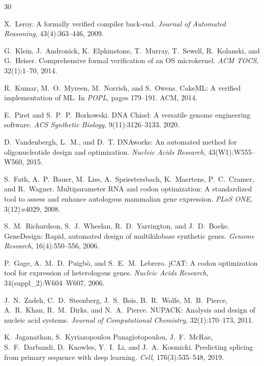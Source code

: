 \documentclass[runningheads]{llncs}
\begin{document}
\begin{thebibliography}{30}

X.~Leroy.
\newblock A formally verified compiler back-end.
\newblock \emph{Journal of Automated Reasoning}, 43(4):363--446, 2009.

G.~Klein, J.~Andronick, K.~Elphinstone, T.~Murray, T.~Sewell, R.~Kolanski,
  and G.~Heiser.
\newblock Comprehensive formal verification of an OS microkernel.
\newblock \emph{ACM TOCS}, 32(1):1--70, 2014.

R.~Kumar, M.~O.~Myreen, M.~Norrish, and S.~Owens.
\newblock CakeML: A verified implementation of ML.
\newblock In \emph{POPL}, pages 179--191. ACM, 2014.

E.~Piret and S.~P.~P.~Borkowski.
\newblock DNA Chisel: A versatile genome engineering software.
\newblock \emph{ACS Synthetic Biology}, 9(11):3126--3133, 2020.

D.~Vandenbergh, L.~M., and D.~T.
\newblock DNAworks: An automated method for oligonucleotide design
  and optimization.
\newblock \emph{Nucleic Acids Research}, 43(W1):W555--W560, 2015.

S.~Fath, A.~P.~Bauer, M.~Liss, A.~Spriestersbach, K.~Maertens,
  P.~C.~Cramer, and R.~Wagner.
\newblock Multiparameter RNA and codon optimization: A standardized
  tool to assess and enhance autologous mammalian gene expression.
\newblock \emph{PLoS ONE}, 3(12):e4029, 2008.

S.~M.~Richardson, S.~J.~Wheelan, R.~D.~Yarrington, and J.~D.~Boeke.
\newblock GeneDesign: Rapid, automated design of multikilobase
  synthetic genes.
\newblock \emph{Genome Research}, 16(4):550--556, 2006.

P.~Gage, A.~M.~D.~Puigb\`{o}, and S.~E.~M.~Lebrero.
\newblock jCAT: A codon optimization tool for expression of
  heterologous genes.
\newblock \emph{Nucleic Acids Research}, 34(suppl\_2):W604--W607, 2006.

J.~N.~Zadeh, C.~D.~Steenberg, J.~S.~Bois, B.~R.~Wolfe,
  M.~B.~Pierce, A.~R.~Khan, R.~M.~Dirks, and N.~A.~Pierce.
\newblock NUPACK: Analysis and design of nucleic acid systems.
\newblock \emph{Journal of Computational Chemistry}, 32(1):170--173,
  2011.

K.~Jaganathan, S.~Kyriazopoulou Panagiotopoulou, J.~F.~McRae,
  S.~F.~Darbandi, D.~Knowles, Y.~I.~Li, and J.~A.~Kosmicki.
\newblock Predicting splicing from primary sequence with deep learning.
\newblock \emph{Cell}, 176(3):535--548, 2019.


\end{thebibliography}
\end{document}
